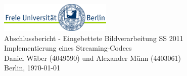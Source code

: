 
\begin{titlepage}
\thispagestyle{empty}

\vspace*{4cm}
\begin{center}
\includegraphics[width=0.4\textwidth]{img/logo-fuberlin} \\
{\huge 
Abschlussbericht - Eingebettete Bildverarbeitung SS 2011\\
Implementierung eines Streaming-Codecs\\}
\vspace{10mm}
\large{
Daniel W\"aber (4049590) und Alexander M\"unn (4403061)\\
Berlin, \today}
\end{center}

\end{titlepage}



